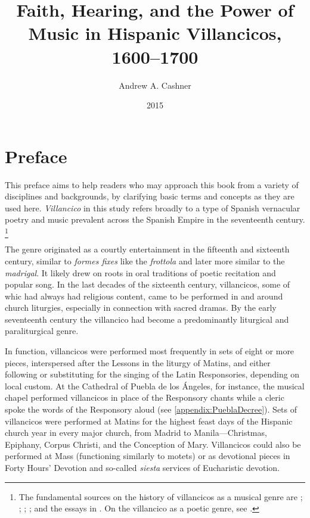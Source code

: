 \documentclass[oneside,12pt]{book}
\begin{document}
\frontmatter

\clearpage

\title{
	Faith, Hearing, and the Power of Music in Hispanic Villancicos, 1600–1700
      }

\author{
	Andrew A. Cashner
      }
\date{
	2015
      }

\maketitle
\tableofcontents

\chapter{Preface}
\label{chapter:preface}

    This preface aims to help readers who may approach this book from a variety of disciplines and backgrounds, by clarifying basic terms and concepts as they are used here.
    \emph{Villancico} in this study refers broadly to a type of Spanish vernacular poetry and music prevalent across the Spanish Empire in the seventeenth century.%
\footnote{
    The fundamental sources on the history of villancicos as a musical genre are
    \autocite{Laird1997};
    \autocite{Rubio1979};
    \autocite{Torrente1997};
    \autocite{Illari2001};
    and the essays in \autocite{Knighton2007a}.
    On the villancico as a poetic genre, see \autocite{Tenorio1999}.
    }
      
    The genre originated as a courtly entertainment in the fifteenth and sixteenth century, similar to \emph{formes fixes} like the \emph{frottola} and later more similar to the \emph{madrigal}.
    It likely drew on roots in oral traditions of poetic recitation and popular song.
    In the last decades of the sixteenth century, villancicos, some of whic had always had religious content, came to be performed in and around church liturgies, especially in connection with sacred dramas.
    By the early seventeenth century the villancico had become a predominantly liturgical and paraliturgical genre.
  
    In function, villancicos were performed most frequently in sets of eight or more pieces, interspersed after the Lessons in the liturgy of Matins, and either following or substituting for the singing of the Latin Responsories, depending on local custom.
    At the Cathedral of Puebla de los Ángeles, for instance, the musical chapel performed villancicos in place of the Responsory chants while a cleric spoke the words of the Responsory aloud (see \ref{appendix:PueblaDecree}).
    Sets of villancicos were performed at Matins for the highest feast days of the Hispanic church year in every major church, from Madrid to Manila—Christmas, Epiphany, Corpus Christi, and the Conception of Mary.
    Villancicos could also be performed at Mass (functioning similarly to motets) or as devotional pieces in Forty Hours’ Devotion and so-called \emph{siesta} services of Eucharistic devotion.
  
\end{document}
